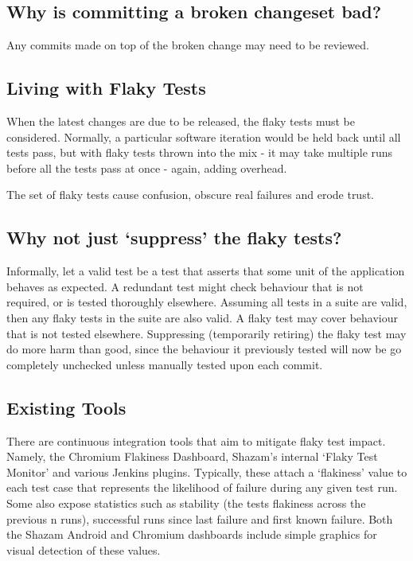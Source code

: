 \subsection{Why is committing a broken changeset bad?}

Any commits made on top of the broken change may need to be reviewed.

\subsection{Living with Flaky Tests}

When the latest changes are due to be released, the flaky tests must be considered. Normally, a particular software iteration would be held back until all tests pass, but with flaky tests thrown into the mix - it may take multiple runs before all the tests pass at once - again, adding overhead.

The set of flaky tests cause confusion, obscure real failures and erode trust.

\subsection{Why not just ‘suppress’ the flaky tests?}

Informally, let a valid test be a test that asserts that some unit of the application behaves as expected. A redundant test might check behaviour that is not required, or is tested thoroughly elsewhere. Assuming all tests in a suite are valid, then any flaky tests in the suite are also valid. A flaky test may cover behaviour that is not tested elsewhere. Suppressing (temporarily retiring) the flaky test may do more harm than good, since the behaviour it previously tested will now be go completely unchecked unless manually tested upon each commit.

\subsection{Existing Tools}

There are continuous integration tools that aim to mitigate flaky test impact. Namely, the Chromium Flakiness Dashboard, Shazam’s internal ‘Flaky Test Monitor’ and various Jenkins plugins. Typically, these attach a ‘flakiness’ value to each test case that represents the likelihood of failure during any given test run. Some also expose statistics such as stability (the tests flakiness across the previous n runs), successful runs since last failure and first known failure. Both the Shazam Android and Chromium dashboards include simple graphics for visual detection of these values.

